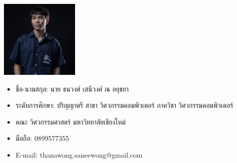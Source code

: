 \documentclass[semifinal]{cpecmu}
\author{นายกฤษฏิ์ อุปนันท์}{Krit Upanun}{600610717}
\author{นายธนวงศ์ เสนีวงศ์ ณ อยุธยา}{Thanawong Saneewong Na Ayutthaya}{600610738}
\begin{document}


\pagestyle{empty}\cleardoublepage
\normalspacing \setcounter{page}{1}  \pagestyle{cpecmu}





\ifproject

\fi



\ifproject
\appendix


\ifglossary\glossarypage\fi

\ifindex\indexpage\fi

\begin{biosketch}
\begin{center}
  \includegraphics[width=1.5in]{./images/tom_pic.jpg}
\end{center}
\begin{itemize}[label={},leftmargin=*]
  \item ชื่อ-นามสกุล: นาย ธนวงศ์ เสนีวงศ์ ณ อยุธยา
  \item ระดับการศึกษา: ปริญญาตรี สาขา วิศวกรรมคอมพิวเตอร์ ภาควิชา วิศวกรรมคอมพิวเตอร์
  \item คณะ วิศวกรรมศาสตร์ มหาวิทยาลัยเชียงใหม่
  \item มือถือ: 0899577355 
  \item E-mail: thanawong.saneewong@gmail.com
\end{itemize}



\end{biosketch}
\end{document}
